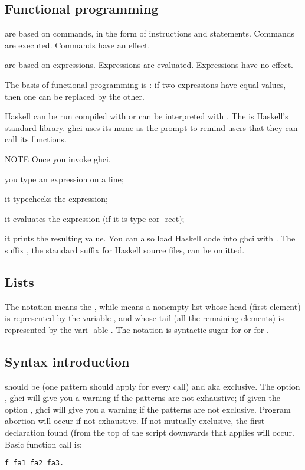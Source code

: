 \subsection{Functional programming}
\begin{compactitem}
\item {} are based on commands, in
the form of instructions and statements. Commands are executed. Commands have an effect.
\item {} are based on expressions. Expressions are evaluated. Expressions have no effect.
\item The basis of functional programming is :
if two expressions have equal values, then one
can be replaced by the other.
\item Haskell can be run compiled with  or can be interpreted with . 
The  is Haskell’s standard library.
ghci uses its name as the prompt to remind users
that they can call its functions.
\item NOTE Once you invoke ghci,
\begin{compactitem}
\item you type an expression on a line;
\item it typechecks the expression;
\item  it evaluates the expression (if it is type cor-
rect);
\item it prints the resulting value.
You can also load Haskell code into ghci with
. The suffix , the standard
suffix for Haskell source files, can be omitted.
\end{compactitem}
\end{compactitem}

\subsection{Lists}
The notation \e{[]} means the , while 
means a nonempty list whose head (first element)
is represented by the variable , and whose tail (all
the remaining elements) is represented by the vari-
able .
The notation \e{["a", "b"]} is syntactic sugar for
 or for \e{["a",["b"]]}. 

\subsection{Syntax introduction}
 should be  (one pattern should apply for every call) and  aka exclusive. The option
, ghci will give you
a warning if the patterns are not exhaustive; if given
the option , ghci
will give you a warning if the patterns are not exclusive. Program abortion will occur if not exhaustive. If not mutually exclusive, the first declaration found (from the top of the script downwards that applies will occur. Basic function call is:
\begin{lstlisting}
f fa1 fa2 fa3.
\end{lstlisting}

